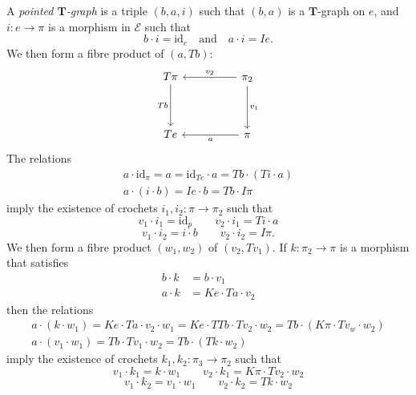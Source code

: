 \documentclass[fleqn]{article}
\newcommand{\oldpage}[1]{\marginpar{\footnotesize$\Big\vert$ \textit{p.~#1}}}
\newcommand{\id}{\mathrm{id}}
\newcommand{\TT}{\mathbf{T}}
\newcommand{\textand}{\quad\text{and}\quad}
\newcommand{\cat}[1]{\mathcal{#1}}
\begin{document}
A \emph{pointed $\TT$-graph} is a triple $(b,a,i)$ such that $(b,a)$ is a $\TT$-graph on $e$, and $i\colon e\to\pi$ is a morphism in $\cat{E}$ such that
\[
  b\cdot i = \id_e
  \textand
  a\cdot i= Ie.
  \tag{1}
\]
We then form a fibre product of $(a,Tb)$:
\[
  \begin{tikzcd}[sep=huge]
    T\pi
      \ar[d,swap,"Tb"]
  & \pi_2
      \ar[l,swap,"v_2"]
      \ar[d,"v_1"]
  \\Te
  & \pi
      \ar[l,"a"]
  \end{tikzcd}
\]
The relations
\[
  \begin{gathered}
    a\cdot\id_\pi
    = a
    = \id_{Te}\cdot a
    = Tb\cdot(Ti\cdot a)
  \\a\cdot(i\cdot b)
    = Ie\cdot b
    = Tb\cdot I\pi
  \end{gathered}
\]
imply the existence of crochets $i_1,i_2\colon\pi\to\pi_2$ such that
\[
  v_1\cdot i_1
  = \id_p
  \qquad
  v_2\cdot i_1
  = Ti\cdot a
  \tag{2}
\]
\[
  v_1\cdot i_2
  = i\cdot b
  \qquad
  v_2\cdot i_2
  = I\pi.
  \tag{3}
\]
\oldpage{226}
We then form a fibre product $(w_1,w_2)$ of $(v_2,Tv_1)$.
If $k\colon\pi_2\to\pi$ is a morphism that satisfies
\[
  \begin{aligned}
    b\cdot k
    &= b\cdot v_1
  \\a\cdot k
    &= Ke\cdot Ta\cdot v_2
  \end{aligned}
  \tag{4}
\]
then the relations
\[
  \begin{gathered}
    a\cdot(k\cdot w_1)
    = Ke\cdot Ta\cdot v_2\cdot w_1
    = Ke\cdot TTb\cdot Tv_2\cdot w_2
    = Tb\cdot(K\pi\cdot Tv_w\cdot w_2)
  \\a\cdot(v_1\cdot w_1)
    = Tb\cdot Tv_1\cdot w_2
    = Tb\cdot (Tk\cdot w_2)
  \end{gathered}
\]
imply the existence of crochets $k_1,k_2\colon\pi_3\to\pi_2$ such that
\[
  v_1\cdot k_1
  = k\cdot w_1
  \qquad
  v_2\cdot k_1
  = K\pi\cdot Tv_2\cdot w_2
  \tag{5}
\]
\[
  v_1\cdot k_2
  = v_1\cdot w_1
  \qquad
  v_2\cdot k_2
  = Tk\cdot w_2
  \tag{6}
\]
\end{document}
